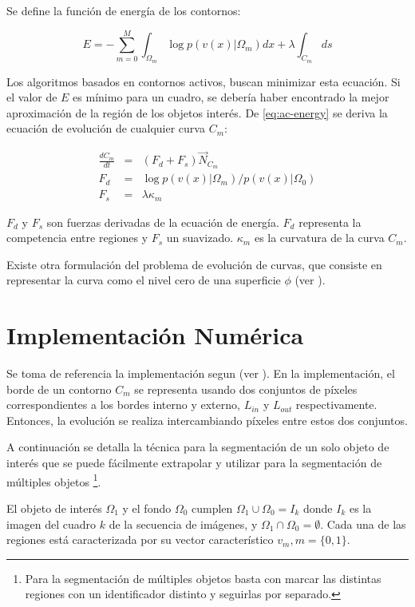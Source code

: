 Se define la función de energía de los contornos:

\begin{equation}
    \label{eq:ac-energy}
    E = - \sum_{m=0}^{M}{\int_{\Omega_m}{\log{p(v(x) \vert \Omega_m)} dx} + \lambda \int_{C_m}{ds}}
\end{equation}

Los algoritmos basados en contornos activos, buscan minimizar esta ecuación. Si el valor de $E$ es mínimo para un cuadro, se
debería haber encontrado la mejor aproximación de la región de los objetos interés. De \ref{eq:ac-energy} se
deriva la ecuación de evolución de cualquier curva $C_m$:

\begin{eqnarray}
    \frac{dC_m}{dt} &=& (F_d + F_s) \overrightarrow{N}_{C_m} \\
    F_d &=& \log{p(v(x) \vert \Omega_m) / p(v(x) \vert \Omega_0)} \\
    F_s &=& \lambda \kappa_m \label{eq:ac-formal}
\end{eqnarray}

$F_d$ y $F_s$ son fuerzas derivadas de la ecuación de energía. $F_d$ representa la competencia entre regiones y $F_s$ un
suavizado. $\kappa_m$ es la curvatura de la curva $C_m$.

Existe otra formulación del problema de evolución de curvas, que consiste en
representar la curva como el nivel cero de una superficie $\phi$ (ver \cite{Osher88}).

\section{Implementación Numérica}
\label{sec:impl}

Se toma de referencia la implementación segun \citeauthor{fast-level-set} (ver \cite{fast-level-set}).
En la implementación, el borde de un contorno $C_m$ se representa usando dos conjuntos de píxeles
correspondientes a los bordes interno y externo, $L_{in}$ y $L_{out}$
respectivamente. Entonces, la evolución se realiza intercambiando píxeles entre
estos dos conjuntos.

A continuación se detalla la técnica para la segmentación de un solo objeto de
interés que se puede fácilmente extrapolar y utilizar para la
segmentación de múltiples objetos
\footnote{Para la segmentación de múltiples objetos basta con marcar las distintas regiones con un identificador
distinto y seguirlas por separado.}.

El objeto de interés $\Omega_{1}$ y el fondo $\Omega_{0}$ cumplen
$\Omega_{1}\cup\Omega_{0} = I_{k}$ donde $I_{k}$ es la imagen del cuadro $k$ de
la secuencia de imágenes, y $\Omega_{1}\cap\Omega_{0} = \emptyset$. Cada una de
las regiones está caracterizada por su vector característico $v_{m}, m =
\{0,1\}$.

